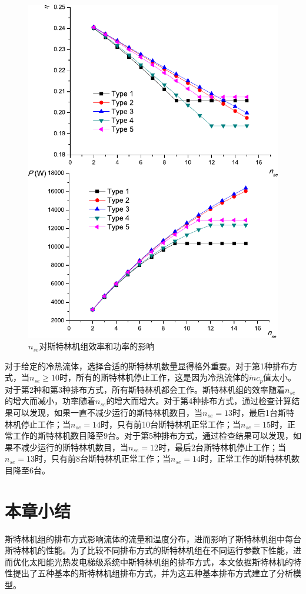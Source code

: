 \noindent \begin{figure}[htbp]
\begin{center}
	\includegraphics[width = 0.7\columnwidth]{fig/n_se}
	\caption{$n_{se}$对斯特林机组效率和功率的影响}
	\label{fig:n_se}
\end{center}
\end{figure}

对于给定的冷热流体，选择合适的斯特林机数量显得格外重要。对于第1种排布方式，当$n_{se} \geqslant 10$时，所有的斯特林机停止工作，这是因为冷热流体的$\dot{m}c_p$值太小。对于第2种和第3种排布方式，所有斯特林机都会工作。斯特林机组的效率随着$n_{se}$的增大而减小，功率随着$n_{se}$的增大而增大。对于第4种排布方式，通过检查计算结果可以发现，如果一直不减少运行的斯特林机数目，当$n_{se} = 13$时，最后1台斯特林机停止工作；当$n_{se} = 14$时，只有前10台斯特林机正常工作；当$n_{se} = 15$时，正常工作的斯特林机数目降至9台。对于第5种排布方式，通过检查结果可以发现，如果不减少运行的斯特林机数目，当$n_{se} = 12$时，最后2台斯特林机停止工作；当$n_{se} = 13$时，只有前8台斯特林机正常工作；当$n_{se} = 14$时，正常工作的斯特林机数目降至6台。

\section{本章小结}

斯特林机组的排布方式影响流体的流量和温度分布，进而影响了斯特林机组中每台斯特林机的性能。为了比较不同排布方式的斯特林机组在不同运行参数下性能，进而优化太阳能光热发电梯级系统中斯特林机组的排布方式，本文依据斯特林机的特性提出了五种基本的斯特林机组排布方式，并为这五种基本排布方式建立了分析模型。

